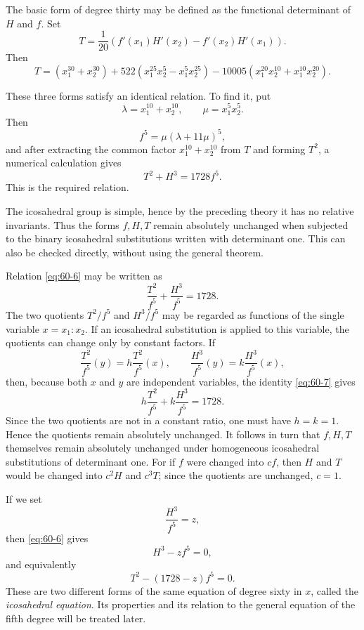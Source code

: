 \documentclass[11pt,a4paper]{book}
\begin{document}
The basic form of degree thirty may be defined as the functional determinant of \(H\) and \(f\).  Set
\begin{equation}\label{eq:60-4}
 T=\frac1{20}\left(f'(x_1)H'(x_2)-f'(x_2)H'(x_1)\right).
\end{equation}
Then
\begin{equation}\label{eq:60-5}
 T=(x_1^{30}+x_2^{30})+522(x_1^{25}x_2^5-x_1^5x_2^{25})-10005(x_1^{20}x_2^{10}+x_1^{10}x_2^{20}).
\end{equation}

These three forms satisfy an identical relation.  To find it, put
\[
 \lambda=x_1^{10}+x_2^{10},
 \qquad
 \mu=x_1^5x_2^5.
\]
Then
\[
 f^5=\mu(\lambda+11\mu)^5,
\]
and after extracting the common factor \(x_1^{10}+x_2^{10}\) from \(T\) and forming \(T^2\), a numerical calculation gives
\begin{equation}\label{eq:60-6}
 T^2+H^3=1728f^5.
\end{equation}
This is the required relation.

The icosahedral group is simple, hence by the preceding theory it has no relative invariants.  Thus the forms \(f,H,T\) remain absolutely unchanged when subjected to the binary icosahedral substitutions written with determinant one.  This can also be checked directly, without using the general theorem.

Relation \eqref{eq:60-6} may be written as
\begin{equation}\label{eq:60-7}
 \frac{T^2}{f^5}+\frac{H^3}{f^5}=1728.
\end{equation}
The two quotients \(T^2/f^5\) and \(H^3/f^5\) may be regarded as functions of the single variable \(x=x_1:x_2\).  If an icosahedral substitution is applied to this variable, the quotients can change only by constant factors.  If
\[
 \frac{T^2}{f^5}(y)=h\frac{T^2}{f^5}(x),
 \qquad
 \frac{H^3}{f^5}(y)=k\frac{H^3}{f^5}(x),
\]
then, because both \(x\) and \(y\) are independent variables, the identity \eqref{eq:60-7} gives
\[
 h\frac{T^2}{f^5}+k\frac{H^3}{f^5}=1728.
\]
Since the two quotients are not in a constant ratio, one must have \(h=k=1\).  Hence the quotients remain absolutely unchanged.  It follows in turn that \(f,H,T\) themselves remain absolutely unchanged under homogeneous icosahedral substitutions of determinant one.  For if \(f\) were changed into \(cf\), then \(H\) and \(T\) would be changed into \(c^2H\) and \(c^3T\); since the quotients are unchanged, \(c=1\).

If we set
\[
 \frac{H^3}{f^5}=z,
\]
then \eqref{eq:60-6} gives
\begin{equation}\label{eq:60-9}
 H^3-zf^5=0,
\end{equation}
and equivalently
\begin{equation}\label{eq:60-10}
 T^2-(1728-z)f^5=0.
\end{equation}
These are two different forms of the same equation of degree sixty in \(x\), called the \emph{icosahedral equation}.  Its properties and its relation to the general equation of the fifth degree will be treated later.
\end{document}

